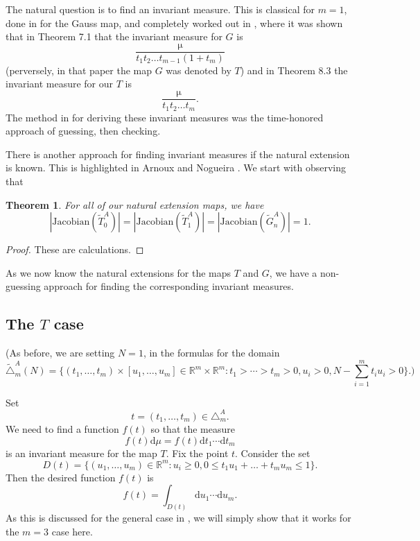 \documentclass[12pt,oneside,openany]{article}
\newtheorem{theorem}{Theorem}[section]
\def\R{{\mathbb R}} %
\begin{document}
The natural question is to find an invariant measure.  This is classical for $m=1$, done in \cite{Ass} for the Gauss map, and completely worked out in \cite{Garrity-Lehmann Duke}, where it was shown that in Theorem 7.1 that the invariant measure for $G$ is 
$$\frac{\mathrm{\mu}}{t_1 t_2 \ldots t_{m-1} ( 1 + t_m)}$$
(perversely, in that paper the map $G$ was denoted by $T$) and in Theorem 8.3 the invariant measure for our $T$ is 
$$\frac{\mathrm{\mu}}{t_1 t_2 \ldots t_{m}}.$$
The method in \cite{Garrity-Lehmann Duke}  for deriving these invariant measures was the time-honored approach of guessing, then checking.

There is another approach for finding invariant measures if the natural extension is known.  This is highlighted in Arnoux and Nogueira \cite{Arnoux-Nogueira-93}.  We start with observing that 

\begin{theorem} For all of our  natural extension maps, we have
$$|\mbox{Jacobian}(\tilde{T}_0^A )| = |\mbox{Jacobian}(\tilde{T}_1^A )| =  |\mbox{Jacobian}(\tilde{G}_n^A )| =1. $$

\end{theorem}
\begin{proof} These are calculations.
\end{proof}

As we now know the natural extensions for the maps $T$ and $G$, we have a non-guessing approach for finding the corresponding invariant measures.

\subsection{The $T$ case}
(As before, we are setting $N=1$, in the formulas for the domain
$$ \tilde{\triangle}_m^A(N) = \{ (t_1, \ldots, t_m)\times [u_1, \ldots, u_m]\in \R^m\times \R^m: t_1 > \cdots > t_m>0, u_i>0,  N- \sum_{i=1}^m t_i u_i >0\}.)$$

Set $$t=(t_1, \ldots, t_m) \in \triangle_m^A.$$
We need to find a function $f(t)$ so that the measure
$$f(t)\mathrm{d} \mu = f(t) \mathrm{d} t_1 \cdots  \mathrm{d} t_m$$
is an invariant measure for the map $T$.
Fix the point $t$.  Consider the set 
$$D(t) = \{ (u_1, \ldots, u_m) \in \R^m:u_i\geq 0, 0\leq t_1u_1 + \ldots + t_m u_m \leq 1\}.$$
Then the desired function $f(t)$ is 
$$f(t) = \int_{D(t)}  \mathrm{d} u_1 \cdots  \mathrm{d} u_m.$$
As this is discussed for  the general case in \cite{Arnoux-Nogueira-93}, we will simply show that it works for the $m=3$ case here.
\end{document}
